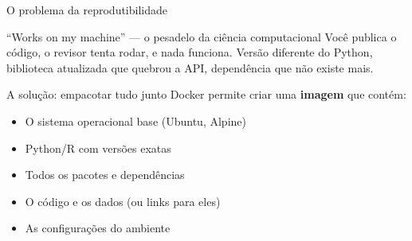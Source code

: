 \begin{frame}[shrink=15]{O problema da reprodutibilidade}
\begin{alertblock}{``Works on my machine'' — o pesadelo da ciência computacional}
Você publica o código, o revisor tenta rodar, e nada funciona. Versão diferente do Python, biblioteca atualizada que quebrou a API, dependência que não existe mais.
\end{alertblock}

\vspace{0.3cm}

\begin{block}{A solução: empacotar tudo junto}
Docker permite criar uma \textbf{imagem} que contém:
\begin{itemize}
    \item O sistema operacional base (Ubuntu, Alpine)
    \item Python/R com versões exatas
    \item Todos os pacotes e dependências
    \item O código e os dados (ou links para eles)
    \item As configurações do ambiente
\end{itemize}
\end{block}

\vspace{0.1cm}
\end{frame}

